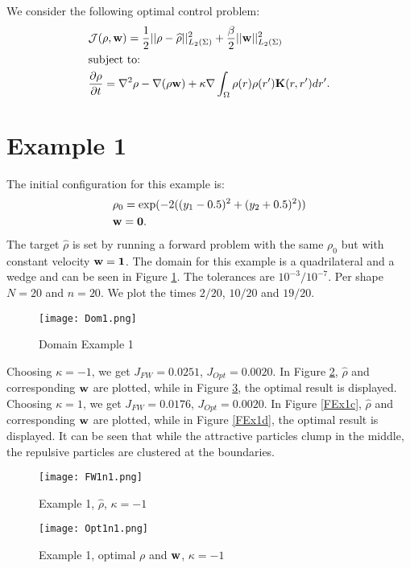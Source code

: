 We consider the following optimal control problem:
\begin{align*}
&\mathcal{J}(\rho, \mathbf{w}) = \frac{1}{2}|| \rho - \widehat \rho||^2_{L_2(\Sigma)} + \frac{\beta}{2}|| \mathbf{w} ||^2_{L_2(\Sigma)}\\
&\text{subject to:}\\
&\frac{\partial \rho}{\partial t} = \nabla^2 \rho - \nabla (\rho \mathbf{w}) + \kappa \nabla \int_\Omega \rho(r) \rho(r') \mathbf{K}(r,r') dr'.
\end{align*}
\section*{Example 1}
The initial configuration for this example is:
\begin{align*}
&\rho_0 = \exp(-2((y_1 - 0.5 )^2 + (y_2 + 0.5)^2))\\
&\mathbf{w} = \mathbf 0.
\end{align*}
The target $\widehat \rho$ is set by running a forward problem with the same $\rho_0$ but with constant velocity $\mathbf{w} = \mathbf{1}$.
The domain for this example is a quadrilateral and a wedge and can be seen in Figure \ref{Dom1}. The tolerances are $10^{-3}/ 10^{-7}$. Per shape $N = 20$ and $n = 20$. We plot the times $2/20$, $10/20$ and $19/20$.

\begin{figure}[h]
	\centering
	\texttt{[image: Dom1.png]}
	\caption{Domain Example 1} 
	\label{Dom1}
\end{figure}
Choosing $\kappa = -1$, we get $J_{FW} = 0.0251$, $J_{Opt} = 0.0020$. In Figure \ref{FEx1a}, $\widehat \rho$ and corresponding $\mathbf{w}$ are plotted, while in Figure \ref{FEx1b}, the optimal result is displayed. Choosing $\kappa = 1$, we get $J_{FW} = 0.0176$, $J_{Opt} = 0.0020$. In Figure \ref{FEx1c}, $\widehat \rho$ and corresponding $\mathbf{w}$ are plotted, while in Figure \ref{FEx1d}, the optimal result is displayed. It can be seen that while the attractive particles clump in the middle, the repulsive particles are clustered at the boundaries.
\begin{figure}[h]
	\centering
	\texttt{[image: FW1n1.png]}
	\caption{Example 1, $\widehat \rho$, $\kappa = -1$} 
	\label{FEx1a}
\end{figure}
\begin{figure}[h]
	\centering
	\texttt{[image: Opt1n1.png]}
	\caption{Example 1, optimal $\rho$ and $\mathbf{w}$, $\kappa = -1$} 
	\label{FEx1b}
\end{figure}


